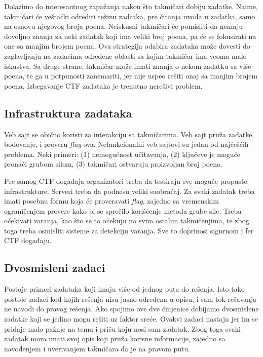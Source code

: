 \documentclass[12pt, a4paper, twocolumn]{article}
\begin{document}
Dolazimo do interesantnog zapažanja nakon što takmičari dobiju zadatke.
Naime, takmičari će veštački odrediti težinu zadatka, pre čitanja uvoda u 
zadatka, samo na osnovu njegovog broja poena. Neiskusni takmičari će pomisliti
da nemaju dovoljno znanja za neki zadatak koji ima veliki broj poena, pa
će se fokusirati na one sa manjim brojem poena. Ova strategija odabira 
zadataka može dovesti do zaglavljanju na zadacima određene oblasti sa kojim
takmičar ima veoma malo iskustva. Sa druge strane, takmičar može imati
znanja o nekom zadatku sa više poena, te ga u potpunosti zanemariti, jer
nije uspeo rešiti onaj sa manjim brojem poena. Izbegavanje CTF zadataka
je trenutno nerešivi problem.

\subsection{Infrastruktura zadataka}

Veb sajt se obično koristi za interakciju sa takmičarima. Veb sajt pruža 
zadatke, bodovanje, i proveru \emph{flag}-ova. Nefunkcionalni veb sajtovi
su jedan od najčešćih problema. Neki primeri: (1) nemogućnost učitavanja,
(2) ključeve je moguće pronaći grubom silom, (3) takmičari ostvaruju 
proizvoljan broj poena.

Pre samog CTF događaja organizatori treba da testiraju sve moguće
propuste infrastrukture. Serveri treba da podnesu veliki saobraćaj.
Za svaki zadatak treba imati posebnu formu koja će proveravati \emph{flag},
zajedno sa vremenskim ograničenjem provere kako bi se sprečilo korišćenje
metoda grube sile. Treba očekivati varanja, kao što se to očekuju na svim 
ostalim takmičenjima, te zbog toga treba osmisliti sisteme za detekciju 
varanja. Sve to doprinosi sigurnom i fer CTF događaju.

\subsection{Dvosmisleni zadaci}

Postoje primeri zadataka koji imaju više od jednog puta do rešenja. Isto
tako postoje zadaci kod kojih rešenja nisu jasno određena u opisu, i
sam tok rešavanja ne navodi do pravog rešenja. Ako spojimo ove dve činjenice
dobijamo dvosmislene zadatke koji se jedino mogu rešiti uz faktor sreće.
Ovakvi zadaci nastaju jer im se pridaje malo pažnje na temu i priču koju 
nosi sam zadatak. Zbog toga svaki zadatak mora imati svoj opis koji pruža
korisne informacije, zajedno sa navođenjem i uverivanjem takmičara da je na 
pravom putu.
\end{document}
